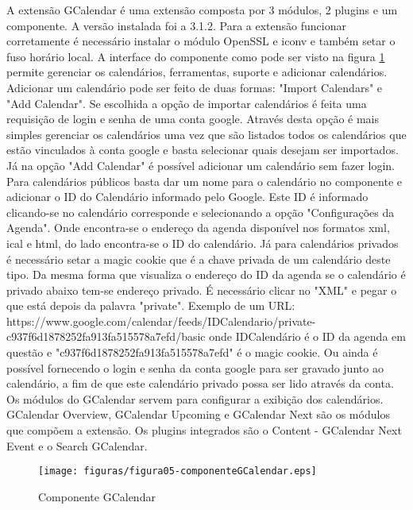 A extensão GCalendar é uma extensão composta por 3 módulos, 2 plugins e um componente. A versão instalada foi a 3.1.2. Para a extensão funcionar corretamente é necessário instalar o módulo OpenSSL e iconv e também setar o fuso horário local. A interface do componente como pode ser visto na figura \ref{fig:GCalendar} permite gerenciar os calendários, ferramentas, suporte e adicionar calendários. Adicionar um calendário pode ser feito de duas formas: "Import Calendars" e "Add Calendar". Se escolhida a opção de importar calendários é feita uma requisição de login e senha de uma conta google. Através desta opção é mais simples gerenciar os calendários uma vez que são listados todos os calendários que estão vinculados à conta google e basta selecionar quais desejam ser importados. Já na opção "Add Calendar" é possível adicionar um calendário sem fazer login. Para calendários públicos basta dar um nome para o calendário no componente e adicionar o ID do Calendário informado pelo Google. Este ID é informado clicando-se no calendário corresponde e selecionando a opção "Configurações da Agenda". Onde encontra-se o endereço da agenda disponível nos formatos xml, ical e html, do lado encontra-se o ID do calendário. Já para calendários privados é necessário setar a magic cookie que é a chave privada de um calendário deste tipo. Da mesma forma que visualiza o endereço do ID da agenda se o calendário é privado abaixo tem-se endereço privado. É necessário clicar no "XML" e pegar o que está depois da palavra "private". Exemplo de um URL: https://www.google.com/calendar/feeds/IDCalendario/private-c937f6d1878252fa913fa515578a7efd/basic onde IDCalendário é o ID da agenda em questão e "c937f6d1878252fa913fa515578a7efd" é o magic cookie. Ou ainda é possível fornecendo o login e senha da conta google para ser gravado junto ao calendário, a fim de que este calendário privado possa ser lido através da conta. Os módulos do GCalendar servem para configurar a exibição dos calendários. GCalendar Overview, GCalendar Upcoming e GCalendar Next são os módulos que compõem a extensão. Os plugins integrados são o  Content - GCalendar Next Event e o Search GCalendar. 

\begin{figure}[hbtn]
   \centering
   \texttt{[image: figuras/figura05-componenteGCalendar.eps]}
   \caption{Componente GCalendar}
   \label{fig:GCalendar}
\end{figure}

